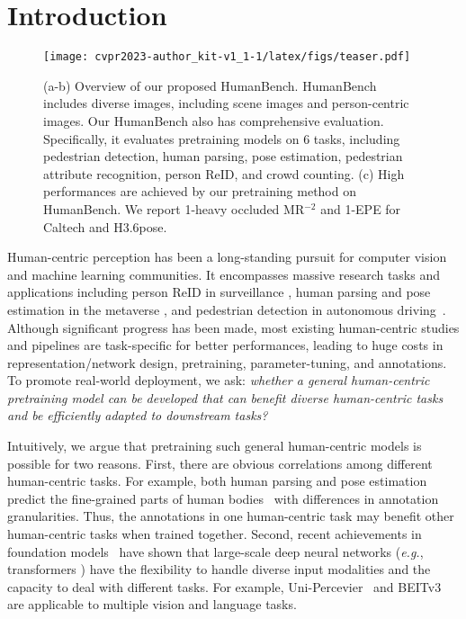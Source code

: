 \documentclass[10pt,twocolumn,letterpaper]{article}
\begin{document}
\section{Introduction}
\label{sec:intro}



\begin{figure*}[t]
    \centering
    \texttt{[image: cvpr2023-author\_kit-v1\_1-1/latex/figs/teaser.pdf]}
    \caption{(a-b) Overview of our proposed HumanBench. HumanBench includes diverse images, including scene images and person-centric images. Our HumanBench also has comprehensive evaluation. Specifically, it evaluates pretraining models on 6 tasks, including pedestrian detection, human parsing, pose estimation, pedestrian attribute recognition, person ReID, and crowd counting. (c) High performances are achieved by our pretraining method on HumanBench. We report 1-heavy occluded MR$^{-2}$ and 1-EPE for Caltech and H3.6pose.}
    \vspace{-1.5em}
    \label{fig:teaser}
\end{figure*}


Human-centric perception has been a long-standing pursuit for computer vision and machine learning communities. It encompasses massive research tasks and applications including person ReID in surveillance \cite{zheng2021online,ge2020self,luo2019bag,ge2020mutual,yu2021multiple}, human parsing and pose estimation in the metaverse \cite{xu2022vitpose, tu2020voxelpose,xiao2018simple,li2021tokenpose,li2022mvitv2,ma2017pose}, and pedestrian detection in autonomous driving~\cite{chu2020detection,lin2020detr,wang2022anchor}. 
Although significant progress has been made, most existing human-centric studies and pipelines are task-specific for better performances, leading to huge costs in representation/network design, pretraining, parameter-tuning, and annotations.
To promote real-world deployment, we ask: \emph{whether a general human-centric pretraining model can be developed that can benefit diverse human-centric tasks and be efficiently adapted to downstream tasks?}





Intuitively, we argue that pretraining such general human-centric models is possible for two reasons. First, there are obvious correlations among different human-centric tasks. For example, both human parsing and pose estimation predict the fine-grained parts of human bodies~\cite{liang2018look,hong2022versatile} with differences in annotation granularities. Thus, the annotations in one human-centric task may benefit other human-centric tasks when trained together. 
Second, recent achievements in foundation models~\cite{vaswani2017attention, devlin2018bert, radford2018improving, radford2019language, brown2020language, lepikhin2020gshard} have shown that large-scale deep neural networks (\emph{e.g.}, transformers \cite{dosovitskiy2020image}) have the flexibility to handle diverse input modalities and the capacity to deal with different tasks. For example, Uni-Percevier~\cite{zhu2022uni} and BEITv3~\cite{wang2022image} are applicable to multiple vision and language tasks.  
\end{document}
